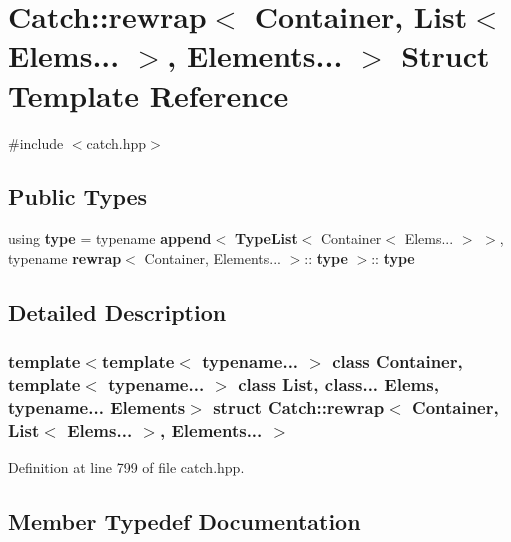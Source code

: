 \section{Catch\+::rewrap$<$ Container, List$<$ Elems... $>$, Elements... $>$ Struct Template Reference}
\label{struct_catch_1_1rewrap_3_01_container_00_01_list_3_01_elems_8_8_8_01_4_00_01_elements_8_8_8_01_4}


{\ttfamily \#include $<$catch.\+hpp$>$}

\subsection*{Public Types}
\begin{DoxyCompactItemize}
\item 
using \textbf{ type} = typename \textbf{ append}$<$ \textbf{ Type\+List}$<$ Container$<$ Elems... $>$ $>$, typename \textbf{ rewrap}$<$ Container, Elements... $>$\+::\textbf{ type} $>$\+::\textbf{ type}
\end{DoxyCompactItemize}


\subsection{Detailed Description}
\subsubsection*{template$<$template$<$ typename... $>$ class Container, template$<$ typename... $>$ class List, class... Elems, typename... Elements$>$\newline
struct Catch\+::rewrap$<$ Container, List$<$ Elems... $>$, Elements... $>$}



Definition at line 799 of file catch.\+hpp.



\subsection{Member Typedef Documentation}
\mbox{\label{struct_catch_1_1rewrap_3_01_container_00_01_list_3_01_elems_8_8_8_01_4_00_01_elements_8_8_8_01_4_a1dea55d690c2ee00d81e44dff797bd22}} 
